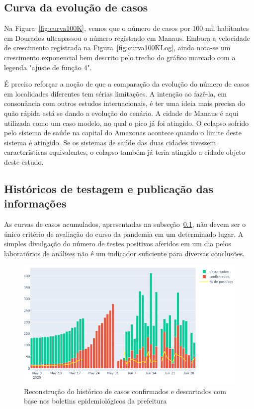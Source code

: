 \documentclass[12pt]{article}
\begin{document}
\subsection{Curva da evolução de casos}\label{ssec:curvas}

Na Figura~\ref{fig:curva100K}, vemos que o número de casos por 100 mil habitantes em Dourados ultrapassou o número registrado em Manaus. Embora a velocidade de crescimento registrada na Figura~\ref{fig:curva100KLog}, ainda nota-se um crescimento exponencial bem descrito pelo trecho do gráfico marcado com a legenda "ajuste de função 4".

É preciso reforçar a noção de que a comparação da evolução do número de casos em localidades diferentes tem sérias limitações. A intenção ao fazê-la, em consonância com outros estudos internacionais, é ter uma ideia mais precisa do quão rápida está se dando a evolução do cenário. A cidade de Manaus é aqui utilizada como um caso modelo, no qual o pico já foi atingido. O colapso sofrido pelo sistema de saúde na capital do Amazonas acontece quando o limite deste sistema é atingido. Se os sistemas de saúde das duas cidades tivessem características equivalentes, o colapso também já teria atingido a cidade objeto deste estudo.

\subsection{Históricos de testagem e publicação das informações}\label{ssec:pubDados}

As curvas de casos acumulados, apresentadas na subseção~\ref{ssec:curvas}, não devem ser o único critério de avaliação do curso da pandemia em um determinado lugar. A simples divulgação do número de testes positivos aferidos em um dia pelos laboratórios de análises não é um indicador suficiente para diversas conclusões.

\begin{figure}[!htb]
  \centering
  \includegraphics[width=.75\textwidth]{figs/casos_conf_desc.png}
  \caption{Reconstrução do histórico de casos confirmados e descartados com base nos boletins epidemiológicos da prefeitura}
  \label{fig:histTeste}
  \end{figure}
\end{document}
